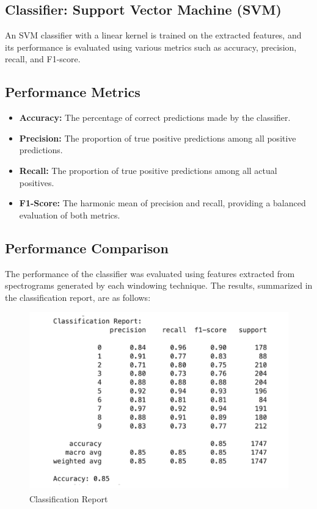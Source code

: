 \documentclass[a4paper,12pt]{article}
\begin{document}
\subsection{Classifier: Support Vector Machine (SVM)}
An SVM classifier with a linear kernel is trained on the extracted features, and its performance is evaluated using various metrics such as accuracy, precision, recall, and F1-score.

\subsection{Performance Metrics}
\begin{itemize}
    \item \textbf{Accuracy:} The percentage of correct predictions made by the classifier.
    \item \textbf{Precision:} The proportion of true positive predictions among all positive predictions.
    \item \textbf{Recall:} The proportion of true positive predictions among all actual positives.
    \item \textbf{F1-Score:} The harmonic mean of precision and recall, providing a balanced evaluation of both metrics.
\end{itemize}

\subsection{Performance Comparison}
The performance of the classifier was evaluated using features extracted from spectrograms generated by each windowing technique. The results, summarized in the classification report, are as follows:
\begin{figure}[H]
    \centering
    \includegraphics[width=1\linewidth]{ClassificationReport.png}
    \caption{Classification Report}
    \label{fig:enter-label}
\end{figure}
\newpage
\end{document}
